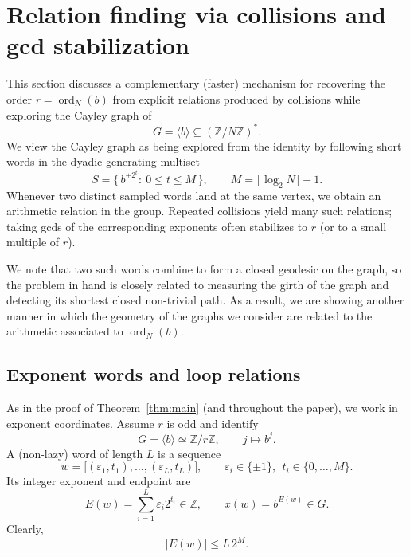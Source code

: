 \documentclass[11pt,reqno]{article}
\numberwithin{equation}{section}
\DeclareMathOperator{\ord}{ord}
\theoremstyle{plain}
\theoremstyle{definition}
\theoremstyle{remark}
\newcommand{\Z}{\mathbb{Z}}
\begin{document}
\section{Relation finding via collisions and gcd stabilization}
\label{N5}

This section discusses a complementary (faster) mechanism for recovering the order $r=\ord_N(b)$
from explicit relations produced by collisions while exploring the Cayley graph of
\[
G=\langle b\rangle \subseteq (\Z/N\Z)^\ast.
\]
We view the Cayley graph as being explored from the identity by following short words in the dyadic
generating multiset
\[
S=\{\,b^{\pm 2^t}:\ 0\le t\le M\,\},
\qquad M=\lfloor \log_2 N\rfloor+1.
\]
Whenever two distinct sampled words land at the same vertex, we obtain an arithmetic
relation in the group.   Repeated collisions yield many such relations;
taking gcds of the corresponding exponents often stabilizes to $r$ (or to a small multiple of $r$).

We note that two such words combine to form a closed geodesic on the graph,
so the problem in hand is closely related to measuring the girth of the graph and
detecting its shortest closed non-trivial path.  As a result, we are showing another manner
in which the geometry of the graphs we consider are related to the arithmetic associated to $\ord_N(b)$.





\subsection{Exponent words and loop relations}
\label{subsec:loops}

As in the proof of Theorem~\ref{thm:main} (and throughout the paper), we work in exponent
coordinates. Assume $r$ is odd and identify
\[
G=\langle b\rangle \simeq \Z/r\Z,\qquad j\longmapsto b^j .
\]
A (non-lazy) word of length $L$ is a sequence
\[
w=\bigl[(\varepsilon_1,t_1),\dots,(\varepsilon_L,t_L)\bigr],
\qquad
\varepsilon_i\in\{\pm1\},\ \ t_i\in\{0,\dots,M\}.
\]
Its integer exponent and endpoint are
\[
E(w)=\sum_{i=1}^L \varepsilon_i 2^{t_i}\in\Z,
\qquad
x(w)=b^{E(w)}\in G .
\]
Clearly,
\begin{equation}\label{eq:E-bound-rel}
|E(w)|\le L\,2^M.
\end{equation}
\end{document}
